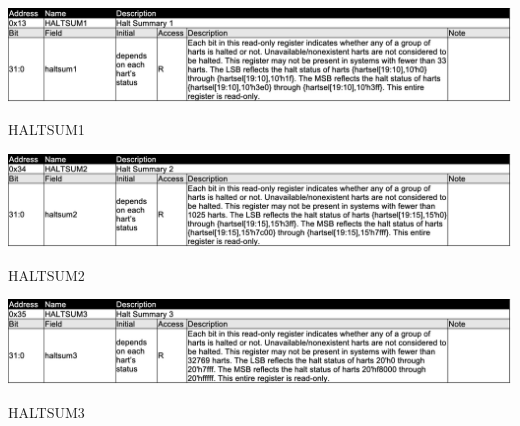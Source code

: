 \begin{table}[H]
    \includegraphics[width=1.00\columnwidth]{./Table/HALTSUM1.png}
    \caption{HALTSUM1}
    \label{tb:HALTSUM1}
\end{table}

\begin{table}[H]
    \includegraphics[width=1.00\columnwidth]{./Table/HALTSUM2.png}
    \caption{HALTSUM2}
    \label{tb:HALTSUM2}
\end{table}

\begin{table}[H]
    \includegraphics[width=1.00\columnwidth]{./Table/HALTSUM3.png}
    \caption{HALTSUM3}
    \label{tb:HALTSUM3}
\end{table}


